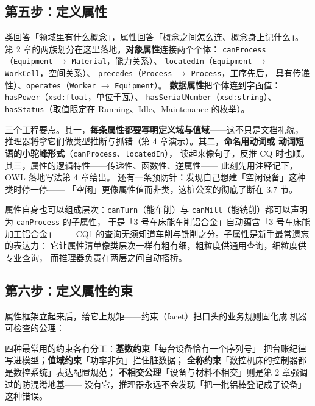 \subsection{第五步：定义属性}

类回答「领域里有什么概念」，属性回答「概念之间怎么连、概念身上记什么」。
第 2 章的两族划分在这里落地。\textbf{对象属性}连接两个个体：
\texttt{canProcess}（\texttt{Equipment} \(\rightarrow\) \texttt{Material}，能力关系）、
\texttt{locatedIn}（\texttt{Equipment} \(\rightarrow\) \texttt{WorkCell}，空间关系）、
\texttt{precedes}（\texttt{Process} \(\rightarrow\) \texttt{Process}，工序先后，
具有传递性）、\texttt{operates}（\texttt{Worker} \(\rightarrow\) \texttt{Equipment}）。
\textbf{数据属性}把个体连到字面值：\texttt{hasPower}（\texttt{xsd:float}，单位千瓦）、
\texttt{hasSerialNumber}（\texttt{xsd:string}）、
\texttt{hasStatus}（取值限定在 Running、Idle、Maintenance 的枚举）。

三个工程要点。其一，\textbf{每条属性都要写明定义域与值域}——这不只是文档礼貌，
推理器将拿它们做类型推断与抓错（第 4 章演示）。其二，\textbf{命名用动词或
动词短语的小驼峰形式}（\texttt{canProcess}、\texttt{locatedIn}），
读起来像句子，反推 CQ 时也顺。其三，属性的逻辑特性——传递性、函数性、逆属性——
此刻先用注释记下，OWL 落地写法第 4 章给出。
还有一条预防针：发现自己想建「空闲设备」这种类时停一停——
「空闲」更像属性值而非类，这桩公案的彻底了断在 3.7 节。

属性自身也可以组成层次：\texttt{canTurn}（能车削）与
\texttt{canMill}（能铣削）都可以声明为 \texttt{canProcess} 的子属性，
于是「3 号车床能车削铝合金」自动蕴含「3 号车床能加工铝合金」——
CQ1 的查询无须知道车削与铣削之分。子属性是新手最常遗忘的表达力：
它让属性清单像类层次一样有粗有细，粗粒度供通用查询，细粒度供专业查询，
而推理器负责在两层之间自动搭桥。

\subsection{第六步：定义属性约束}

属性框架立起来后，给它上规矩——约束（facet）把口头的业务规则固化成
机器可检查的公理：



四种最常用的约束各有分工：\textbf{基数约束}「每台设备恰有一个序列号」
把台账纪律写进模型；\textbf{值域约束}「功率非负」拦住脏数据；
\textbf{全称约束}「数控机床的控制器都是数控系统」表达配置规范；
\textbf{不相交公理}「设备与材料不相交」则是第 2 章强调过的防混淆地基——
没有它，推理器永远不会发现「把一批铝棒登记成了设备」这种错误。

